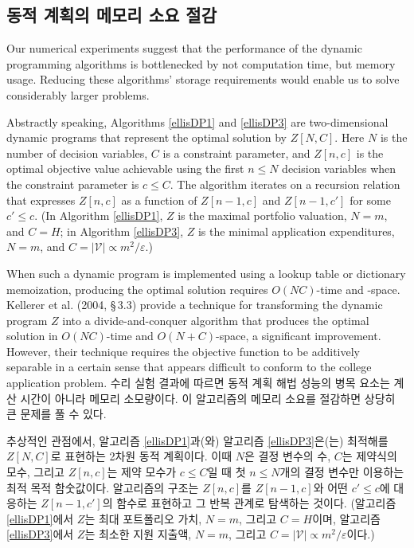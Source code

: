 \documentclass[11pt]{article} %
\newif\ifen
\theoremstyle{definition}
\theoremstyle{definition}
\begin{document}
\ifen \subsection{Memory-efficient dynamic programs}\else \subsection{동적 계획의 메모리 소요 절감}\fi
\ifen
Our numerical experiments suggest that the performance of the dynamic programming algorithms is bottlenecked by not computation time, but memory usage. Reducing these algorithms' storage requirements would enable us to solve considerably larger problems.

Abstractly speaking, Algorithms \ref{ellisDP1} and \ref{ellisDP3} are two-dimensional dynamic programs that represent the optimal solution by $Z[N, C]$. Here $N$ is the number of decision variables, $C$ is a constraint parameter, and $Z[n, c]$ is the optimal objective value achievable using the first $n\leq N$ decision variables when the constraint parameter is $c \leq C$. The algorithm iterates on a recursion relation that expresses $Z[n, c]$ as a function of $Z[n -1, c]$ and $Z[n -1, c']$ for some $c' \leq c$. (In Algorithm \ref{ellisDP1}, $Z$ is the maximal portfolio valuation, $N = m$, and $C =H$; in Algorithm \ref{ellisDP3},  $Z$ is the minimal application expenditures, $N = m$, and $C = |\mathcal{V}| \propto m^2 / \varepsilon$.)

When such a dynamic program is implemented using a lookup table or dictionary memoization, producing the optimal solution requires $O(NC)$-time and -space. Kellerer et al. (2004, \S\,3.3) provide a technique for transforming the dynamic program $Z$ into a divide-and-conquer algorithm that produces the optimal solution in $O(N C)$-time and $O(N + C)$-space, a significant improvement. However, their technique requires the objective function to be additively separable in a certain sense that appears difficult to conform to the college application problem. 
\else
수리 실험 결과에 따르면 동적 계획 해법 성능의 병목 요소는 계산 시간이 아니라 메모리 소모량이다. 이 알고리즘의 메모리 소요를 절감하면 상당히 큰 문제를 풀 수 있다.

추상적인 관점에서, 알고리즘 \ref{ellisDP1}과(와) 알고리즘 \ref{ellisDP3}은(는) 최적해를 $Z[N, C]$로 표현하는 2차원 동적 계획이다. 이때 $N$은 결정 변수의 수, $C$는 제약식의 모수, 그리고 $Z[n, c]$는 제약 모수가 $c \leq C$일 때 첫 $n\leq N$개의 결정 변수만 이용하는 최적 목적 함숫값이다. 알고리즘의 구조는 $Z[n, c]$를 $Z[n -1, c]$와 어떤 $c' \leq c$에 대응하는 $Z[n -1, c']$의 함수로 표현하고 그 반복 관계로 탐색하는 것이다. (알고리즘 \ref{ellisDP1}에서 $Z$는 최대 포트폴리오 가치, $N = m$, 그리고 $C =H$이며, 알고리즘 \ref{ellisDP3}에서 $Z$는 최소한 지원 지출액, $N = m$, 그리고 $C= |\mathcal{V}| \propto m^2 / \varepsilon$이다.)
\end{document}
